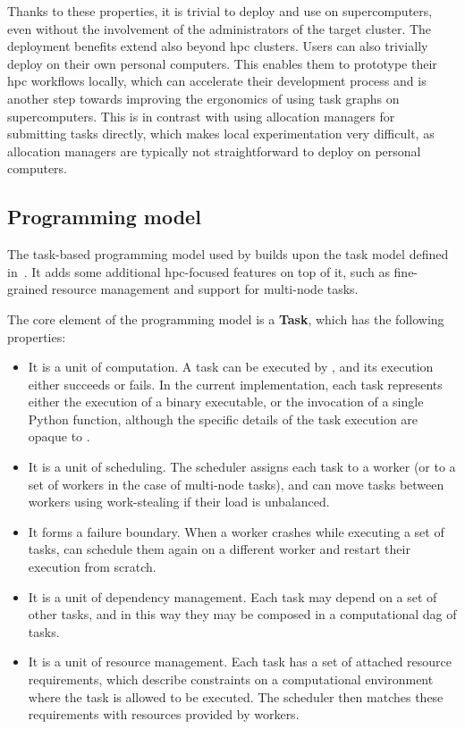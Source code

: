 Thanks to these properties, it is trivial to deploy and use \hyperqueue{} on
supercomputers, even without the involvement of the administrators of the target cluster. The
deployment benefits extend also beyond \gls{hpc} clusters. Users can also trivially
deploy \hyperqueue{} on their own personal computers. This enables them to prototype
their \gls{hpc} workflows locally, which can accelerate their development process and
is another step towards improving the ergonomics of using task graphs on supercomputers. This is in
contrast with using allocation managers for submitting tasks directly, which makes local
experimentation very difficult, as allocation managers are typically not straightforward to deploy
on personal computers.

\subsection{Programming model}
\label{sec:hq-programming-model}
The task-based programming model used by \hyperqueue{} builds upon the task model defined
in~. It adds some additional \gls{hpc}-focused features on top
of it, such as fine-grained resource management and support for multi-node tasks.

The core element of the programming model is a \textbf{Task}, which has the following
properties:
\begin{itemize}
	\item It is a unit of computation. A task can be executed by \hq{}, and its execution
	      either succeeds or fails. In the current implementation, each task represents either the execution
	      of a binary executable, or the invocation of a single Python function, although the specific
	      details of the task execution are opaque to \hyperqueue{}.
	\item It is a unit of scheduling. The \hq{} scheduler assigns each task to a worker (or
	      to a set of workers in the case of multi-node tasks), and can move tasks between workers using
	      work-stealing if their load is unbalanced.
	\item It forms a failure boundary. When a worker crashes while executing a set of tasks,
	      \hq{} can schedule them again on a different worker and restart their execution
	      from scratch.
	\item It is a unit of dependency management. Each task may depend on a set of other tasks, and in this
	      way they may be composed in a computational \gls{dag} of tasks.
	\item It is a unit of resource management. Each task has a set of attached resource requirements, which
	      describe constraints on a computational environment where the task is allowed to be executed. The
	      \hq{} scheduler then matches these requirements with resources provided by
	      workers.
\end{itemize}

